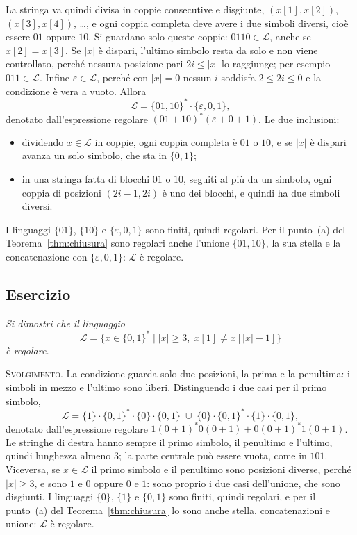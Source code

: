 \documentclass[a4paper, 11pt, oneside]{book}
\makeatletter
\theoremstyle{formale}
\newcommand{\spaziominimo}[1]{%
    \par
    \if@nobreak\else
        \ifdim\pagegoal<\maxdimen
            \ifdim\dimexpr\pagegoal-\pagetotal\relax<#1\relax
                \ifdim\pagetotal>\pagegoal\else
                    \newpage
                \fi
            \fi
        \fi
    \fi}
\newcounter{escount}[section]
\newcommand{\esercizio}{
    \spaziominimo{8\baselineskip}%
    \refstepcounter{escount}%
    \subsection*{Esercizio \arabic{escount}}%
}
\makeatother
\begin{document}
    La stringa va quindi divisa in coppie consecutive e disgiunte, $(x[1], x[2])$,
    $(x[3], x[4])$, \dots, e ogni coppia completa deve avere i due simboli diversi, cio\`e
    essere $01$ oppure $10$. Si guardano solo queste coppie: $0110 \in \mathcal{L}$, anche
    se $x[2] = x[3]$. Se $|x|$ \`e dispari, l'ultimo simbolo resta da solo e non viene
    controllato, perch\'e nessuna posizione pari $2i \leq |x|$ lo raggiunge; per esempio
    $011 \in \mathcal{L}$. Infine $\varepsilon \in \mathcal{L}$, perch\'e con $|x| = 0$
    nessun $i$ soddisfa $2 \leq 2i \leq 0$ e la condizione \`e vera a vuoto. Allora
    \begin{equation*}
        \mathcal{L} = \{01, 10\}^* \cdot \{\varepsilon, 0, 1\},
    \end{equation*}
    denotato dall'espressione regolare $(01 + 10)^* (\varepsilon + 0 + 1)$. Le due
    inclusioni:
    \begin{itemize}
        \item[($\subseteq$)] dividendo $x \in \mathcal{L}$ in coppie, ogni coppia completa
            \`e $01$ o $10$, e se $|x|$ \`e dispari avanza un solo simbolo, che sta in
            $\{0, 1\}$;
        \item[($\supseteq$)] in una stringa fatta di blocchi $01$ o $10$, seguiti al pi\`u
            da un simbolo, ogni coppia di posizioni $(2i - 1, 2i)$ \`e uno dei blocchi, e
            quindi ha due simboli diversi.
    \end{itemize}
    I linguaggi $\{01\}$, $\{10\}$ e $\{\varepsilon, 0, 1\}$ sono finiti, quindi
    regolari. Per il punto~(a) del Teorema~\ref{thm:chiusura} sono regolari anche
    l'unione $\{01, 10\}$, la sua stella e la concatenazione con $\{\varepsilon, 0, 1\}$:
    $\mathcal{L}$ \`e regolare.

    \esercizio
    \textit{Si dimostri che il linguaggio
    \begin{equation*}
        \mathcal{L} = \{x \in \{0, 1\}^* \mid |x| \geq 3,\; x[1] \neq x[|x| - 1]\}
    \end{equation*}
    \`e regolare.}

    \textsc{Svolgimento}. La condizione guarda solo due posizioni, la prima e la
    penultima: i simboli in mezzo e l'ultimo sono liberi. Distinguendo i due casi per il
    primo simbolo,
    \begin{equation*}
        \mathcal{L} = \{1\} \cdot \{0, 1\}^* \cdot \{0\} \cdot \{0, 1\}
            \;\cup\; \{0\} \cdot \{0, 1\}^* \cdot \{1\} \cdot \{0, 1\},
    \end{equation*}
    denotato dall'espressione regolare $1(0 + 1)^*0(0 + 1) + 0(0 + 1)^*1(0 + 1)$. Le
    stringhe di destra hanno sempre il primo simbolo, il penultimo e l'ultimo, quindi
    lunghezza almeno $3$; la parte centrale pu\`o essere vuota, come in $101$. Viceversa,
    se $x \in \mathcal{L}$ il primo simbolo e il penultimo sono posizioni diverse, perch\'e
    $|x| \geq 3$, e sono $1$ e $0$ oppure $0$ e $1$: sono proprio i due casi
    dell'unione, che sono disgiunti. I linguaggi $\{0\}$, $\{1\}$ e $\{0, 1\}$ sono
    finiti, quindi regolari, e per il punto~(a) del Teorema~\ref{thm:chiusura} lo sono
    anche stella, concatenazioni e unione: $\mathcal{L}$ \`e regolare.
\end{document}
